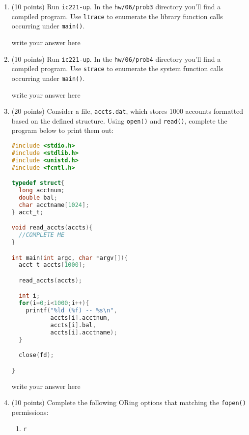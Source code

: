 \documentclass{article}[9pt]
\newenvironment{answerfont}{\fontfamily{qhv}\selectfont}{\par}
\newenvironment{myanswer}{\begin{mdframed}\begin{answerfont}}{\end{answerfont}\end{mdframed}}
\begin{document}
\begin{enumerate}
\begin{enumerate}
\end{enumerate}

\item (10 points) Run \texttt{ic221-up}. In the \texttt{hw/06/prob3} directory you'll find a compiled
program. Use \texttt{ltrace} to enumerate the library function calls
occurring under \texttt{main()}.

\begin{myanswer}
write your answer here
\end{myanswer}

\item (10 points) Run \texttt{ic221-up}. In the \texttt{hw/06/prob4} directory you'll find a compiled
program. Use \texttt{strace} to enumerate the system function calls
occurring under \texttt{main()}.

\begin{myanswer}
write your answer here
\end{myanswer}

\item (20 points) Consider a file, \texttt{accts.dat}, which stores 1000 accounts
formatted based on the defined structure. Using \texttt{open()} and
\texttt{read()}, complete the program below to print them out:


\begin{lstlisting}[language=c]
#include <stdio.h>
#include <stdlib.h>
#include <unistd.h>
#include <fcntl.h>

typedef struct{
  long acctnum;
  double bal;
  char acctname[1024];
} acct_t;

void read_accts(accts){
  //COMPLETE ME
}

int main(int argc, char *argv[]){
  acct_t accts[1000];

  read_accts(accts);

  int i;
  for(i=0;i<1000;i++){
    printf("%ld (%f) -- %s\n",
           accts[i].acctnum,
           accts[i].bal,
           accts[i].acctname);
  }

  close(fd);

}
\end{lstlisting}

\begin{myanswer}
write your answer here
\end{myanswer}

\item (10 points) Complete the following ORing options that matching the \texttt{fopen()} permissions:
\begin{enumerate}
\item \texttt{r}


\end{enumerate}
\end{enumerate}
\end{document}
